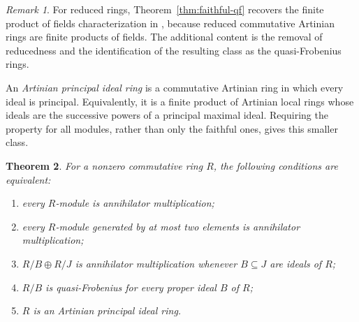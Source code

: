 \documentclass[11pt]{amsart}
\theoremstyle{plain}
\newtheorem{theorem}{Theorem}[section]
\theoremstyle{definition}
\theoremstyle{remark}
\newtheorem{remark}[theorem]{Remark}
\numberwithin{equation}{section}
\begin{document}
\begin{remark}
For reduced rings, Theorem~\ref{thm:faithful-qf} recovers the finite
product of fields characterization in \cite[Theorem~5]{KocAMM}, because
reduced commutative Artinian rings are finite products of fields.
The additional content is the removal of reducedness and the
identification of the resulting class as the quasi-Frobenius rings.
\end{remark}

An \emph{Artinian principal ideal ring} is a commutative Artinian ring
in which every ideal is principal. Equivalently, it is a finite product
of Artinian local rings whose ideals are the successive powers of a
principal maximal ideal. Requiring the property for all modules,
rather than only the faithful ones, gives this smaller class.

\begin{theorem}\label{thm:all-modules-pir}
For a nonzero commutative ring $R$, the following conditions are equivalent:
\begin{enumerate}[label=\textup{(\roman*)}]
\item every $R$-module is annihilator multiplication;
\item every $R$-module generated by at most two elements is annihilator
multiplication;
\item $R/B\oplus R/J$ is annihilator multiplication whenever $B\subseteq J$
are ideals of $R$;
\item $R/B$ is quasi-Frobenius for every proper ideal $B$ of $R$;
\item $R$ is an Artinian principal ideal ring.
\end{enumerate}
\end{theorem}
\end{document}
